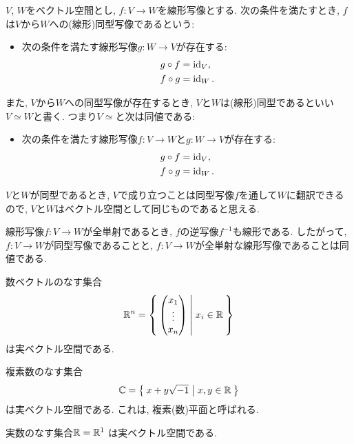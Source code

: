 \begin{definition}
  $V$, $W$をベクトル空間とし,
  $f\colon V\to W$を線形写像とする.
  次の条件を満たすとき,
  $f$は$V$から$W$への(線形)同型写像であるという:
  \begin{itemize}
  \item 次の条件を満たす線形写像$g\colon W\to V$が存在する:
    \begin{align*}
      g\circ f &=\operatorname{id}_V,\\
      f\circ g &=\operatorname{id}_W.
    \end{align*}
  \end{itemize}
  また, $V$から$W$への同型写像が存在するとき,
  $V$と$W$は(線形)同型であるといい$V\simeq W$と書く.
  つまり$V\simeq$と次は同値である:
  \begin{itemize}
  \item 次の条件を満たす線形写像$f\colon V\to W$と$g\colon W\to V$が存在する:
    \begin{align*}
      g\circ f &=\operatorname{id}_V,\\
      f\circ g &=\operatorname{id}_W.
    \end{align*}
  \end{itemize}
\end{definition}
\begin{remark}
  $V$と$W$が同型であるとき,
  $V$で成り立つことは同型写像$f$を通して$W$に翻訳できるので,
  $V$と$W$はベクトル空間として同じものであると思える.
\end{remark}
\begin{remark}
  線形写像$f\colon V\to W$が全単射であるとき,
  $f$の逆写像$f^{-1}$も線形である.
  したがって,
  $f\colon V\to W$が同型写像であることと,
  $f\colon V\to W$が全単射な線形写像であることは同値である.
\end{remark}
\begin{example}
  数ベクトルのなす集合
  \begin{align*}
    \mathbb{R}^n=\Set{\begin{pmatrix}x_1\\\vdots\\x_n\end{pmatrix}|x_i\in\mathbb{R}}
  \end{align*}
  は実ベクトル空間である. 
\end{example}
\begin{example}
  複素数のなす集合
  \begin{align*}
    \mathbb{C}=\Set{x+y\sqrt{-1}|x,y\in\mathbb{R}}
  \end{align*}
  は実ベクトル空間である.
  これは, 複素(数)平面と呼ばれる.
\end{example}
\begin{example}
  実数のなす集合$\mathbb{R}=\mathbb{R}^1$
  は実ベクトル空間である.
\end{example}

